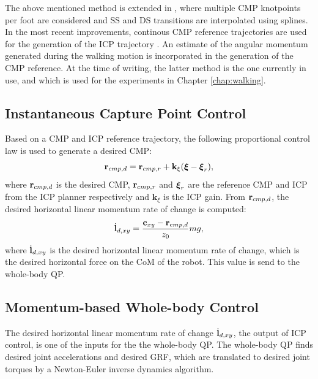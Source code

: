 The above mentioned method is extended in \cite{englsberger2014trajectory}, where multiple \ac{CMP} knotpoints per foot are considered and \ac{SS} and \ac{DS} transitions are interpolated using splines. In the most recent improvements, continous \ac{CMP} reference trajectories are used for the generation of the \ac{ICP} trajectory \cite{seyde2018inclusion}. An estimate of the angular momentum generated during the walking motion is incorporated in the generation of the \ac{CMP} reference. At the time of writing, the latter method is the one currently in use, and which is used for the experiments in Chapter \ref{chap:walking}.
\subsection{Instantaneous Capture Point Control}\label{sec:icpcontrol}
Based on a \ac{CMP} and \ac{ICP} reference trajectory, the following proportional control law is used to generate a desired \ac{CMP}:
\begin{equation}
    \mathbf{r}_{cmp,d}=\mathbf{r}_{cmp,r} + \mathbf{k}_{\xi}(\boldsymbol{\xi}-\boldsymbol{\xi}_r),
    \label{eq:rcmpd}
\end{equation}
where $\mathbf{r}_{cmp,d}$ is the desired \ac{CMP}, $\mathbf{r}_{cmp,r}$ and $\boldsymbol{\xi}_r$ are the reference \ac{CMP} and \ac{ICP} from the \ac{ICP} planner respectively and $\mathbf{k}_{\xi}$ is the \ac{ICP} gain. From $\mathbf{r}_{cmp,d}$, the desired horizontal linear momentum rate of change is computed:
\begin{equation}\label{eq:dotldxy}
    \dot{\mathbf{l}}_{d,xy} = \frac{\mathbf{c}_{xy}-\mathbf{r}_{cmp,d}}{z_0}mg,
\end{equation}
where $\dot{\mathbf{l}}_{d,xy}$ is the desired horizontal linear momentum rate of change, which is the desired horizontal force on the \ac{CoM} of the robot. This value is send to the whole-body \ac{QP}. 

\subsection{Momentum-based Whole-body Control}
The desired horizontal linear momentum rate of change $\dot{\mathbf{l}}_{d,xy}$, the output of \ac{ICP} control, is one of the inputs for the the whole-body \ac{QP}. The whole-body \ac{QP} finds desired joint accelerations and desired \ac{GRF}, which are translated to desired joint torques by a Newton-Euler inverse dynamics algorithm.
